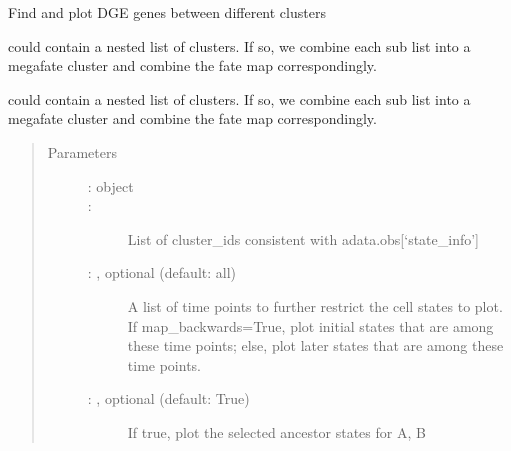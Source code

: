 \documentclass[letterpaper,10pt,english]{sphinxmanual}
\begin{document}
\begin{fulllineitems}
\label{\detokenize{cospar.pl.differential_genes_for_given_fates:cospar.pl.differential_genes_for_given_fates}}
Find and plot DGE genes between different clusters

 could contain a nested list of clusters. If so, we
combine each sub list into a mega\sphinxhyphen{}fate cluster and combine the fate
map correspondingly.

 could contain a nested list of clusters. If so, we
combine each sub list into a mega\sphinxhyphen{}fate cluster and combine the fate
map correspondingly.
\begin{quote}\begin{description}
\item[{Parameters}] \leavevmode\begin{description}
\item[{ :  object}] \leavevmode


\item[{ : }] \leavevmode
List of cluster\_ids consistent with adata.obs{[}‘state\_info’{]}

\item[{ : , optional (default: all)}] \leavevmode
A list of time points to further restrict the cell states to plot.
If map\_backwards=True, plot initial states that are among these time points;
else, plot later states that are among these time points.

\item[{ : , optional (default: True)}] \leavevmode
If true, plot the selected ancestor states for A, B


\end{description}
\end{description}
\end{quote}
\end{fulllineitems}
\end{document}

